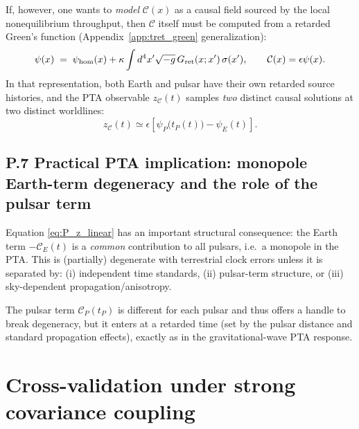 \documentclass[10pt]{article}
\newcommand{\Eclk}{E}
\begin{document}
If, however, one wants to \emph{model} $\mathcal{C}(x)$ as a causal field sourced by the local nonequilibrium throughput,
then $\mathcal{C}$ itself must be computed from a retarded Green’s function (Appendix~\ref{app:tret_green} generalization):
\begin{equation}
\psi(x) \;=\; \psi_{\rm hom}(x)
+\kappa\int d^4x'\sqrt{-g}\,G_{\rm ret}(x;x')\,\sigma(x'),
\qquad \mathcal{C}(x)=\epsilon\psi(x).
\label{eq:P_retarded_field}
\end{equation}
In that representation, both Earth and pulsar have their own retarded source histories, and the PTA observable
$z_\mathcal{C}(t)$ samples \emph{two} distinct causal solutions at two distinct worldlines:
\begin{equation}
z_\mathcal{C}(t)\simeq \epsilon\left[\psi_P\bigl(t_P(t)\bigr)-\psi_{\Eclk}(t)\right].
\label{eq:P_two_worldlines}
\end{equation}

\subsection{P.7 Practical PTA implication: monopole Earth-term degeneracy and the role of the pulsar term}
\label{app:pta:pta_implications}

Equation \eqref{eq:P_z_linear} has an important structural consequence:
the Earth term $-\mathcal{C}_{\Eclk}(t)$ is a \emph{common} contribution to all pulsars, i.e.\ a monopole in the PTA.
This is (partially) degenerate with terrestrial clock errors unless it is separated by:
(i) independent time standards, (ii) pulsar-term structure, or (iii) sky-dependent propagation/anisotropy.

The pulsar term $\mathcal{C}_P(t_P)$ is different for each pulsar and thus offers a handle to break degeneracy,
but it enters at a retarded time (set by the pulsar distance and standard propagation effects), exactly as in
the gravitational-wave PTA response.



\section{Cross-validation under strong covariance coupling}
\label{app:cv}
\end{document}
